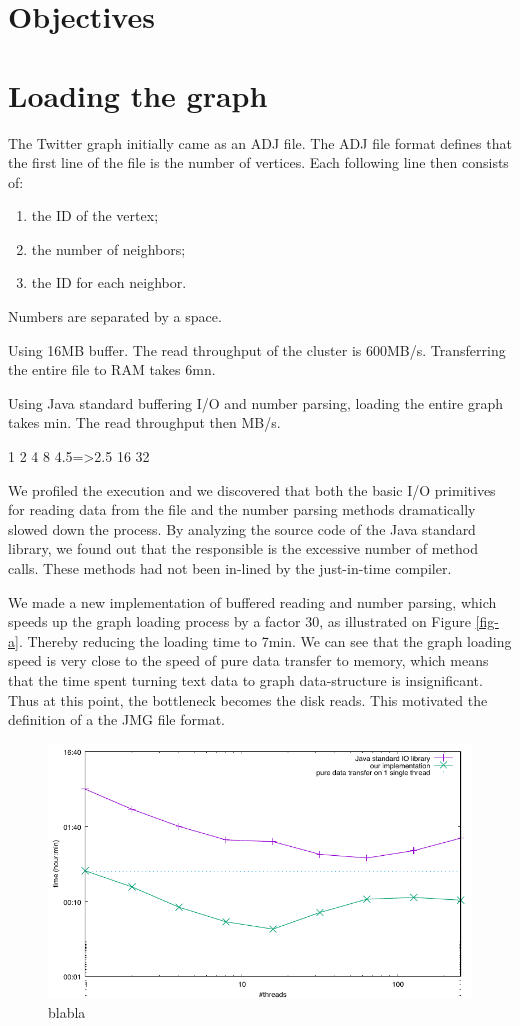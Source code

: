 \documentclass[11pt,a4paper]{article}
\begin{document}
\section{Objectives}




\section{Loading the graph}


The Twitter graph initially came as an ADJ file. The ADJ file format defines that the first line of the file is the number of vertices. Each following line then consists of:
\begin{enumerate}
\item the ID of the vertex;
\item the number of neighbors;
\item the ID for each neighbor.
\end{enumerate}
Numbers are separated by a space.


Using 16MB buffer.
The read throughput of the cluster is 600MB/s. Transferring the entire file to RAM takes 6mn.

Using Java standard buffering I/O and number parsing, loading the entire graph takes min. The read throughput then MB/s.

1
2
4
8		4.5=>2.5
16
32

We profiled the execution and we discovered that both  the  basic I/O primitives for reading data from the file and the number parsing methods dramatically slowed down the process. By analyzing the source code of the Java standard library, we found out that the responsible is the excessive number of method calls. These methods had not been in-lined by the just-in-time compiler.

We made a new implementation of buffered reading and number parsing, which speeds up the graph loading process by a factor 30, as illustrated on Figure \ref{fig-a}. Thereby reducing the loading time to 7min. We can see that the graph loading speed is very close to the speed of pure data transfer to memory, which means that the time spent turning text data to graph data-structure is insignificant. Thus at this point, the bottleneck becomes the disk reads. This motivated the definition of a the JMG file format.


\begin{figure}
\begin{center}
\includegraphics[width=0.8\linewidth]{load.pdf}
\end{center}
\caption{blabla}
\end{figure}
\end{document}
